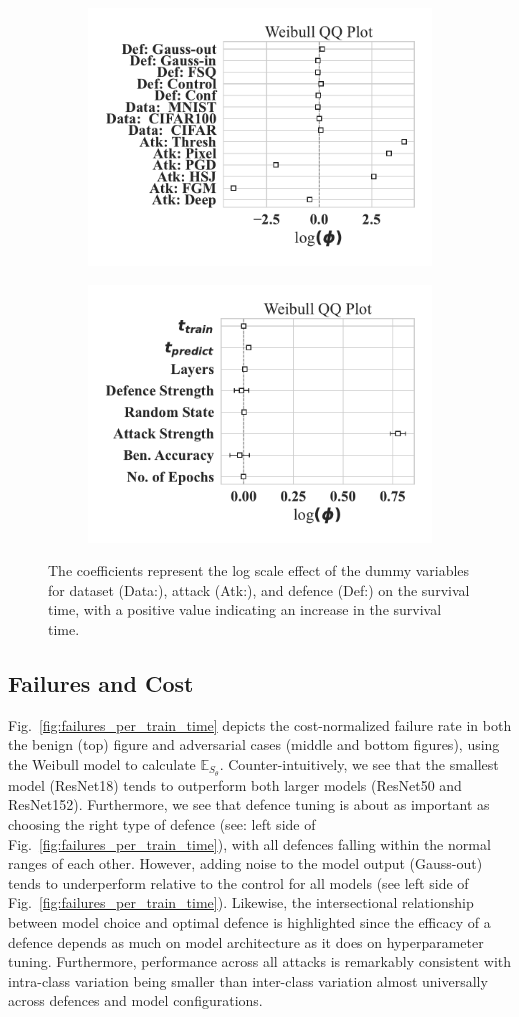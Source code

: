 \begin{figure}
    \centering
	\begin{subfigure}
	\centering
    \includegraphics[width=.38\textwidth]{plots/weibull_aft_dummies.pdf}
    \label{fig:covariates}
    \end{subfigure}
    \begin{subfigure}
	\centering
    \includegraphics[width=.38\textwidth]{plots/weibull_aft.pdf}
    \label{fig:dummies}
    \end{subfigure}
    \caption{The coefficients represent the log scale effect of the dummy variables for dataset (Data:), attack (Atk:), and defence (Def:) on the survival time, with a positive value indicating an increase in the survival time.}
\end{figure}

\subsection{Failures and Cost}


Fig.~\ref{fig:failures_per_train_time} depicts the cost-normalized failure rate in both the benign (top) figure and adversarial cases (middle and bottom figures), using the Weibull model to calculate $\mathbb{E}_{S_\theta}$. Counter-intuitively, we see that the smallest model (ResNet18) tends to outperform both larger models (ResNet50 and ResNet152). Furthermore, we see that defence tuning is about as important as choosing the right type of defence (see: left side of Fig.~\ref{fig:failures_per_train_time}), with all defences falling within the normal ranges of each other. However, adding noise to the model output (Gauss-out) tends to underperform relative to the control for all models (see left side of Fig.~\ref{fig:failures_per_train_time}). Likewise, the intersectional relationship between model choice and optimal defence is highlighted since the efficacy of a defence depends as much on model architecture as it does on hyperparameter tuning.  Furthermore, performance across all attacks is remarkably consistent with intra-class variation being smaller than inter-class variation almost universally across defences and model configurations. 

